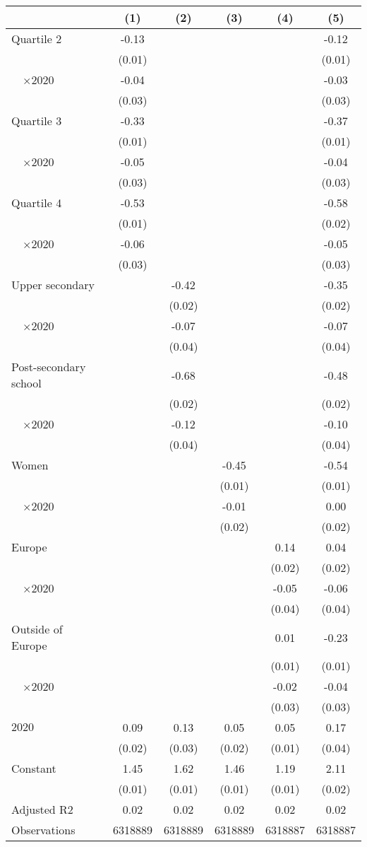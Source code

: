 
\begin{tabular}{@{}l*{5}{S[table-format={-}2.2{\tnote{***}}]}@{}}
\toprule
{} & {(1)} & {(2)} & {(3)} & {(4)} & {(5)}\tabularnewline%
\midrule
Quartile 2 & -0.13\tnote{***} &  &  &  & -0.12\tnote{***}\tabularnewline%
 & (0.01) &  &  &  & \vphantom{1} (0.01)\tabularnewline%
~~\(\times 2020\) & -0.04 &  &  &  & -0.03\tabularnewline%
 & (0.03) &  &  &  & \vphantom{2} (0.03)\tabularnewline%
Quartile 3 & -0.33\tnote{***} &  &  &  & -0.37\tnote{***}\tabularnewline%
 & (0.01) &  &  &  & (0.01)\tabularnewline%
~~\(\times 2020\) & -0.05 &  &  &  & -0.04\tabularnewline%
 & (0.03) &  &  &  & \vphantom{1} (0.03)\tabularnewline%
Quartile 4 & -0.53\tnote{***} &  &  &  & -0.58\tnote{***}\tabularnewline%
 & (0.01) &  &  &  & (0.02)\tabularnewline%
~~\(\times 2020\) & -0.06\tnote{*} &  &  &  & -0.05\tabularnewline%
 & (0.03) &  &  &  & (0.03)\tabularnewline%
Upper secondary &  & -0.42\tnote{***} &  &  & -0.35\tnote{***}\tabularnewline%
 &  & (0.02) &  &  & \vphantom{1} (0.02)\tabularnewline%
~~\(\times 2020\) &  & -0.07\tnote{\dagger} &  &  & -0.07\tnote{\dagger}\tabularnewline%
 &  & (0.04) &  &  & \vphantom{1} (0.04)\tabularnewline%
Post-secondary school &  & -0.68\tnote{***} &  &  & -0.48\tnote{***}\tabularnewline%
 &  & (0.02) &  &  & (0.02)\tabularnewline%
~~\(\times 2020\) &  & -0.12\tnote{**} &  &  & -0.10\tnote{*}\tabularnewline%
 &  & (0.04) &  &  & (0.04)\tabularnewline%
Women &  &  & -0.45\tnote{***} &  & -0.54\tnote{***}\tabularnewline%
 &  &  & (0.01) &  & (0.01)\tabularnewline%
~~\(\times 2020\) &  &  & -0.01 &  & 0.00\tabularnewline%
 &  &  & (0.02) &  & (0.02)\tabularnewline%
Europe &  &  &  & 0.14\tnote{***} & 0.04\tnote{*}\tabularnewline%
 &  &  &  & (0.02) & (0.02)\tabularnewline%
~~\(\times 2020\) &  &  &  & -0.05 & -0.06\tabularnewline%
 &  &  &  & (0.04) & (0.04)\tabularnewline%
Outside of Europe &  &  &  & 0.01 & -0.23\tnote{***}\tabularnewline%
 &  &  &  & (0.01) & (0.01)\tabularnewline%
~~\(\times 2020\) &  &  &  & -0.02 & -0.04\tabularnewline%
 &  &  &  & (0.03) & (0.03)\tabularnewline%
\midrule
\(2020\) & 0.09\tnote{***} & 0.13\tnote{***} & 0.05\tnote{**} & 0.05\tnote{***} & 0.17\tnote{***}\tabularnewline%
 & (0.02) & (0.03) & (0.02) & (0.01) & (0.04)\tabularnewline%
Constant & 1.45\tnote{***} & 1.62\tnote{***} & 1.46\tnote{***} & 1.19\tnote{***} & 2.11\tnote{***}\tabularnewline%
 & (0.01) & (0.01) & (0.01) & (0.01) & (0.02)\tabularnewline%
\midrule
Adjusted R2 & 0.02 & 0.02 & 0.02 & 0.02 & 0.02\tabularnewline%
Observations & {\num{6318889}} & {\num{6318889}} & {\num{6318889}} & {\num{6318887}} & {\num{6318887}}\tabularnewline%
\bottomrule
\end{tabular}
